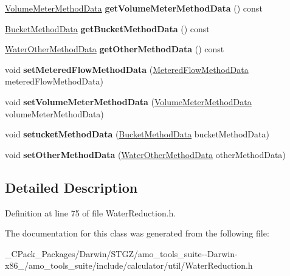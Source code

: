 \begin{DoxyCompactItemize}
\hyperlink{class_volume_meter_method_data}{Volume\+Meter\+Method\+Data} {\bfseries get\+Volume\+Meter\+Method\+Data} () const
\item 
\mbox{\label{class_water_reduction_input_ae327c2bd833db5da7251c605e27dd1d3}} 
\hyperlink{class_bucket_method_data}{Bucket\+Method\+Data} {\bfseries get\+Bucket\+Method\+Data} () const
\item 
\mbox{\label{class_water_reduction_input_ac18e59397bcb7aee57d7f9cc74bc5d07}} 
\hyperlink{class_water_other_method_data}{Water\+Other\+Method\+Data} {\bfseries get\+Other\+Method\+Data} () const
\item 
\mbox{\label{class_water_reduction_input_adb1fb8446cce129a6c99b298ccb8cc23}} 
void {\bfseries set\+Metered\+Flow\+Method\+Data} (\hyperlink{class_metered_flow_method_data}{Metered\+Flow\+Method\+Data} metered\+Flow\+Method\+Data)
\item 
\mbox{\label{class_water_reduction_input_a6cb184a7e87c8f6602fb4b23fe99d0d3}} 
void {\bfseries set\+Volume\+Meter\+Method\+Data} (\hyperlink{class_volume_meter_method_data}{Volume\+Meter\+Method\+Data} volume\+Meter\+Method\+Data)
\item 
\mbox{\label{class_water_reduction_input_a17a480f7b3f54a14c4dbbca956faba08}} 
void {\bfseries setucket\+Method\+Data} (\hyperlink{class_bucket_method_data}{Bucket\+Method\+Data} bucket\+Method\+Data)
\item 
\mbox{\label{class_water_reduction_input_aa5fdd9f96fdc7f92f657d3fa2157aa78}} 
void {\bfseries set\+Other\+Method\+Data} (\hyperlink{class_water_other_method_data}{Water\+Other\+Method\+Data} other\+Method\+Data)
\end{DoxyCompactItemize}


\subsection{Detailed Description}


Definition at line 75 of file Water\+Reduction.\+h.



The documentation for this class was generated from the following file\+:\begin{DoxyCompactItemize}
\item 
\+\_\+\+C\+Pack\+\_\+\+Packages/\+Darwin/\+S\+T\+G\+Z/amo\+\_\+tools\+\_\+suite-\/-\/\+Darwin-\/x86\+\_/amo\+\_\+tools\+\_\+suite/include/calculator/util/Water\+Reduction.\+h\end{DoxyCompactItemize}
